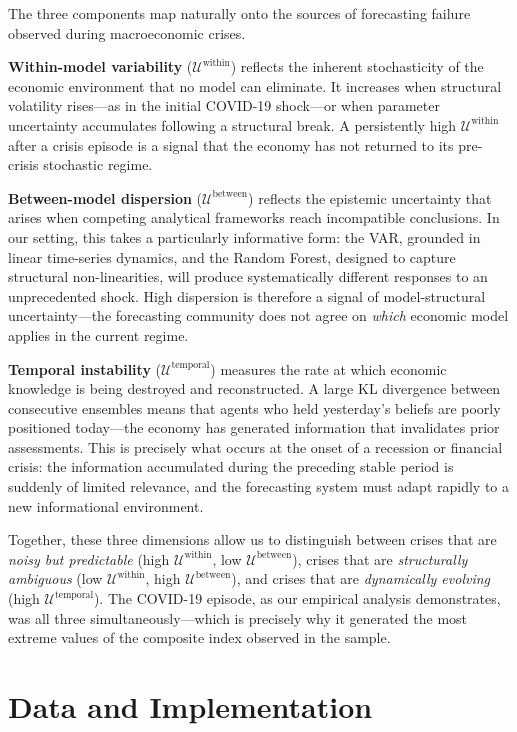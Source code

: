 \documentclass[12pt,a4paper]{article}
\theoremstyle{remark}
\begin{document}
The three components map naturally onto the sources of forecasting failure
observed during macroeconomic crises.

\textbf{Within-model variability} ($\mathcal{U}^{\text{within}}$) reflects
the inherent stochasticity of the economic environment that no model can
eliminate. It increases when structural volatility rises—as in the initial
COVID-19 shock—or when parameter uncertainty accumulates following a
structural break. A persistently high $\mathcal{U}^{\text{within}}$ after
a crisis episode is a signal that the economy has not returned to its
pre-crisis stochastic regime.

\textbf{Between-model dispersion} ($\mathcal{U}^{\text{between}}$) reflects
the epistemic uncertainty that arises when competing analytical frameworks
reach incompatible conclusions. In our setting, this takes a particularly
informative form: the VAR, grounded in linear time-series dynamics, and
the Random Forest, designed to capture structural non-linearities, will
produce systematically different responses to an unprecedented shock.
High dispersion is therefore a signal of model-structural uncertainty—the
forecasting community does not agree on \emph{which} economic model applies
in the current regime.

\textbf{Temporal instability} ($\mathcal{U}^{\text{temporal}}$) measures
the rate at which economic knowledge is being destroyed and reconstructed.
A large KL divergence between consecutive ensembles means that agents who
held yesterday's beliefs are poorly positioned today—the economy has
generated information that invalidates prior assessments. This is precisely
what occurs at the onset of a recession or financial crisis: the
information accumulated during the preceding stable period is suddenly of
limited relevance, and the forecasting system must adapt rapidly to a new
informational environment.

Together, these three dimensions allow us to distinguish between crises
that are \emph{noisy but predictable} (high $\mathcal{U}^{\text{within}}$,
low $\mathcal{U}^{\text{between}}$), crises that are \emph{structurally
ambiguous} (low $\mathcal{U}^{\text{within}}$, high
$\mathcal{U}^{\text{between}}$), and crises that are
\emph{dynamically evolving} (high $\mathcal{U}^{\text{temporal}}$). The
COVID-19 episode, as our empirical analysis demonstrates, was all three
simultaneously—which is precisely why it generated the most extreme values
of the composite index observed in the sample.

\section{Data and Implementation}
\end{document}
